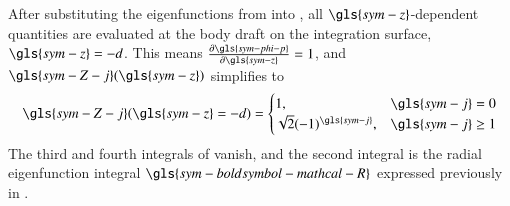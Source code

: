 After substituting the eigenfunctions from  into , all $\gls{sym-z}$-dependent quantities are evaluated at the body draft on the integration surface, $\gls{sym-z}=-d$.
This means $\frac{\partial \gls{sym-phi-p}}{\partial \gls{sym-z}}=1$, and $\gls{sym-Z-j}(\gls{sym-z})$ simplifies to
\begin{equation}
    \gls{sym-Z-j} (\gls{sym-z}=-d) =
    \begin{cases}
        1,& \gls{sym-j}=0
        \\
        \sqrt2(-1)^{\gls{sym-j}},& \gls{sym-j} \geq 1
    \end{cases}
\end{equation}
The third and fourth integrals of  vanish, and the second integral is the radial eigenfunction integral $\gls{sym-boldsymbol-mathcal-R}$ expressed previously in .

